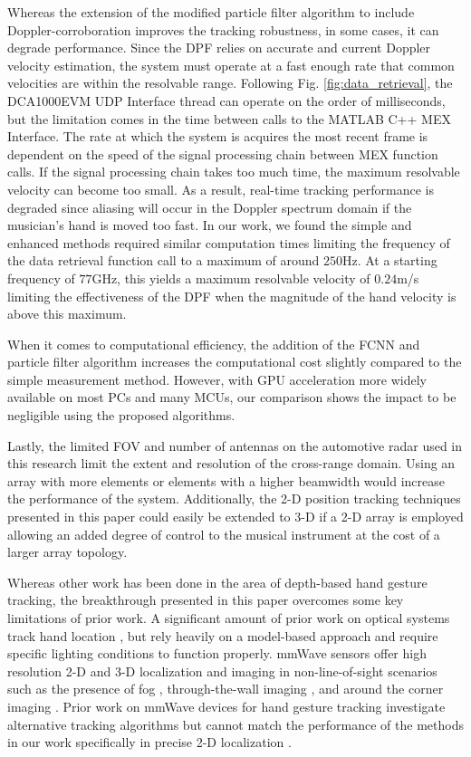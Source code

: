 \documentclass[10pt,journal,final]{IEEEtran}
\begin{document}
Whereas the extension of the modified particle filter algorithm to include Doppler-corroboration improves the tracking robustness, in some cases, it can degrade performance. Since the DPF relies on accurate and current Doppler velocity estimation, the system must operate at a fast enough rate that common velocities are within the resolvable range. Following Fig. \ref{fig:data_retrieval}, the DCA1000EVM UDP Interface thread can operate on the order of milliseconds, but the limitation comes in the time between calls to the MATLAB C++ MEX Interface. The rate at which the system is acquires the most recent frame is dependent on the speed of the signal processing chain between MEX function calls. If the signal processing chain takes too much time, the maximum resolvable velocity can become too small. As a result, real-time tracking performance is degraded since aliasing will occur in the Doppler spectrum domain if the musician's hand is moved too fast. In our work, we found the simple and enhanced methods required similar computation times limiting the frequency of the data retrieval function call to a maximum of around $250$Hz. At a starting frequency of $77$GHz, this yields a maximum resolvable velocity of $0.24$m/s limiting the effectiveness of the DPF when the magnitude of the hand velocity is above this maximum.

When it comes to computational efficiency, the addition of the FCNN and particle filter algorithm increases the computational cost slightly compared to the simple measurement method. However, with GPU acceleration more widely available on most PCs and many MCUs, our comparison shows the impact to be negligible using the proposed algorithms.

Lastly, the limited FOV and number of antennas on the automotive radar used in this research limit the extent and resolution of the cross-range domain. Using an array with more elements or elements with a higher beamwidth would increase the performance of the system. Additionally, the 2-D position tracking techniques presented in this paper could easily be extended to 3-D if a 2-D array is employed allowing an added degree of control to the musical instrument at the cost of a larger array topology.

Whereas other work has been done in the area of depth-based hand gesture tracking, the breakthrough presented in this paper overcomes some key limitations of prior work. A significant amount of prior work on optical systems track hand location \cite{optical_tracking:kinect,optical_tracking:zaman,mmWave_tracking:ThuMouse}, but rely heavily on a model-based approach and require specific lighting conditions to function properly. mmWave sensors offer high resolution 2-D and 3-D localization and imaging in non-line-of-sight scenarios such as the presence of fog \cite{radar:fog}, through-the-wall imaging \cite{radar:through_the_wall_imaging_and_tracking}, and around the corner imaging \cite{radar:around_the_corner1}. Prior work on mmWave devices for hand gesture tracking investigate alternative tracking algorithms but cannot match the performance of the methods in our work specifically in precise 2-D localization \cite{mmWave_tracking:ThuMouse,mmWave_tracking:WiDeo}. 
\end{document}

